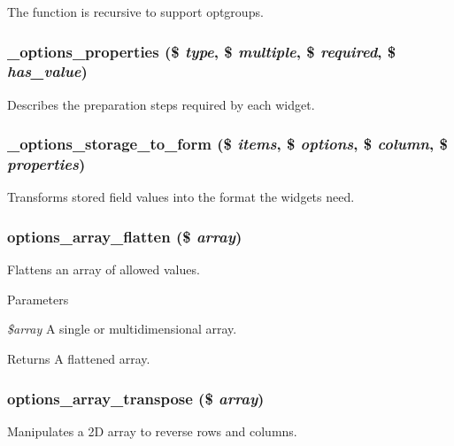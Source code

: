 The function is recursive to support optgroups. \hypertarget{options_8module_a77844a0b5beb19eaa6a58ba1213150e5}{
\subsubsection[{\_\-options\_\-properties}]{\setlength{\rightskip}{0pt plus 5cm}\_\-options\_\-properties (\$ {\em type}, \/  \$ {\em multiple}, \/  \$ {\em required}, \/  \$ {\em has\_\-value})}}
\label{options_8module_a77844a0b5beb19eaa6a58ba1213150e5}
Describes the preparation steps required by each widget. \hypertarget{options_8module_a2685060524ba869cbf096e798a374070}{
\subsubsection[{\_\-options\_\-storage\_\-to\_\-form}]{\setlength{\rightskip}{0pt plus 5cm}\_\-options\_\-storage\_\-to\_\-form (\$ {\em items}, \/  \$ {\em options}, \/  \$ {\em column}, \/  \$ {\em properties})}}
\label{options_8module_a2685060524ba869cbf096e798a374070}
Transforms stored field values into the format the widgets need. \hypertarget{options_8module_aae0e4ab472c2c47597c915b106c6faf3}{
\subsubsection[{options\_\-array\_\-flatten}]{\setlength{\rightskip}{0pt plus 5cm}options\_\-array\_\-flatten (\$ {\em array})}}
\label{options_8module_aae0e4ab472c2c47597c915b106c6faf3}
Flattens an array of allowed values.


\begin{DoxyParams}{Parameters}
\item[{\em \$array}]A single or multidimensional array. \end{DoxyParams}
\begin{DoxyReturn}{Returns}
A flattened array. 
\end{DoxyReturn}
\hypertarget{options_8module_ad8c45e3075cbf026b5838474c28a9dc0}{
\subsubsection[{options\_\-array\_\-transpose}]{\setlength{\rightskip}{0pt plus 5cm}options\_\-array\_\-transpose (\$ {\em array})}}
\label{options_8module_ad8c45e3075cbf026b5838474c28a9dc0}
Manipulates a 2D array to reverse rows and columns.


